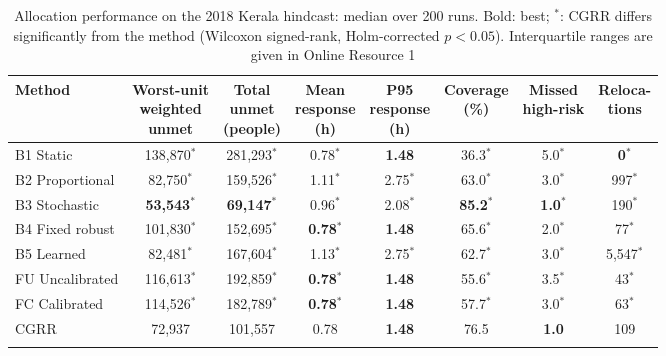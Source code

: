 \documentclass[pdflatex,sn-basic]{sn-jnl}
\theoremstyle{plain}%
\theoremstyle{remark}%
\theoremstyle{definition}%
\begin{document}
\begin{table}[h]
\caption{Allocation performance on the 2018 Kerala hindcast: median over 200 runs. Bold: best; $^{\ast}$: CGRR differs significantly from the method (Wilcoxon signed-rank, Holm-corrected $p<0.05$). Interquartile ranges are given in Online Resource 1}\label{tab:main}
\footnotesize
\begin{tabular*}{\textwidth}{@{\extracolsep\fill}lccccccc}
\toprule
Method & \makecell{Worst-unit\\weighted\\unmet} & \makecell{Total\\unmet\\(people)} & \makecell{Mean\\response\\(h)} & \makecell{P95\\response\\(h)} & \makecell{Coverage\\(\%)} & \makecell{Missed\\high-risk} & \makecell{Reloca-\\tions} \\
\midrule
B1 Static & 138,870$^{\ast}$ & 281,293$^{\ast}$ & 0.78$^{\ast}$ & \textbf{1.48} & 36.3$^{\ast}$ & 5.0$^{\ast}$ & \textbf{0}$^{\ast}$ \\
B2 Proportional & 82,750$^{\ast}$ & 159,526$^{\ast}$ & 1.11$^{\ast}$ & 2.75$^{\ast}$ & 63.0$^{\ast}$ & 3.0$^{\ast}$ & 997$^{\ast}$ \\
B3 Stochastic & \textbf{53,543}$^{\ast}$ & \textbf{69,147}$^{\ast}$ & 0.96$^{\ast}$ & 2.08$^{\ast}$ & \textbf{85.2}$^{\ast}$ & \textbf{1.0}$^{\ast}$ & 190$^{\ast}$ \\
B4 Fixed robust & 101,830$^{\ast}$ & 152,695$^{\ast}$ & \textbf{0.78}$^{\ast}$ & \textbf{1.48} & 65.6$^{\ast}$ & 2.0$^{\ast}$ & 77$^{\ast}$ \\
B5 Learned & 82,481$^{\ast}$ & 167,604$^{\ast}$ & 1.13$^{\ast}$ & 2.75$^{\ast}$ & 62.7$^{\ast}$ & 3.0$^{\ast}$ & 5,547$^{\ast}$ \\
FU Uncalibrated & 116,613$^{\ast}$ & 192,859$^{\ast}$ & \textbf{0.78}$^{\ast}$ & \textbf{1.48} & 55.6$^{\ast}$ & 3.5$^{\ast}$ & 43$^{\ast}$ \\
FC Calibrated & 114,526$^{\ast}$ & 182,789$^{\ast}$ & \textbf{0.78}$^{\ast}$ & \textbf{1.48} & 57.7$^{\ast}$ & 3.0$^{\ast}$ & 63$^{\ast}$ \\
CGRR & 72,937 & 101,557 & 0.78 & \textbf{1.48} & 76.5 & \textbf{1.0} & 109 \\
\botrule
\end{tabular*}
\end{table}
\end{document}
